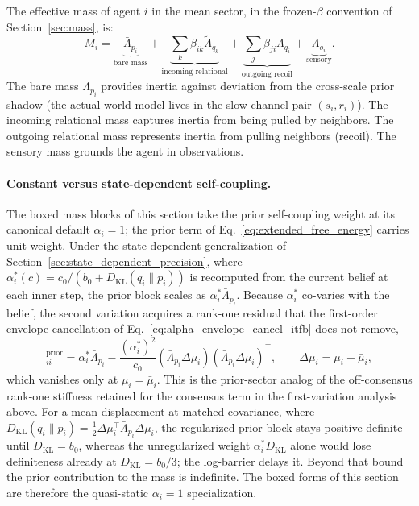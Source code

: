 \documentclass[11pt]{article}
\begin{document}
The effective mass of agent $i$ in the mean sector, in the frozen-$\beta$ convention of Section~\ref{sec:mass}, is:
\begin{equation}
M_i = \underbrace{\bar{\Lambda}_{p_i}}_{\text{bare mass}} + \underbrace{\sum_k \beta_{ik}\tilde{\Lambda}_{q_k}}_{\text{incoming relational}} + \underbrace{\sum_j \beta_{ji}\Lambda_{q_i}}_{\text{outgoing recoil}} + \underbrace{\Lambda_{o_i}}_{\text{sensory}}.
\label{eq:effective_mass}
\end{equation}
The bare mass $\bar{\Lambda}_{p_i}$ provides inertia against deviation from the cross-scale prior shadow (the actual world-model lives in the slow-channel pair $(s_i, r_i)$). The incoming relational mass captures inertia from being pulled by neighbors. The outgoing relational mass represents inertia from pulling neighbors (recoil). The sensory mass grounds the agent in observations.

\paragraph{Constant versus state-dependent self-coupling.} The boxed mass blocks of this section take the prior self-coupling weight at its canonical default $\alpha_i = 1$; the prior term of Eq.~\eqref{eq:extended_free_energy} carries unit weight. Under the state-dependent generalization of Section~\ref{sec:state_dependent_precision}, where $\alpha_i^*(c) = c_0/(b_0 + D_{\mathrm{KL}}(q_i \| p_i))$ is recomputed from the current belief at each inner step, the prior block scales as $\alpha_i^* \bar{\Lambda}_{p_i}$. Because $\alpha_i^*$ co-varies with the belief, the second variation acquires a rank-one residual that the first-order envelope cancellation of Eq.~\eqref{eq:alpha_envelope_cancel_itfb} does not remove,
\begin{equation}
[M_{\mu\mu}]_{ii}^{\text{prior}} = \alpha_i^* \bar{\Lambda}_{p_i} - \frac{(\alpha_i^*)^2}{c_0}\left(\bar{\Lambda}_{p_i}\Delta\mu_i\right)\left(\bar{\Lambda}_{p_i}\Delta\mu_i\right)^\top, \qquad \Delta\mu_i = \mu_i - \bar{\mu}_i,
\end{equation}
which vanishes only at $\mu_i = \bar{\mu}_i$. This is the prior-sector analog of the off-consensus rank-one stiffness retained for the consensus term in the first-variation analysis above. For a mean displacement at matched covariance, where $D_{\mathrm{KL}}(q_i \| p_i) = \tfrac{1}{2}\Delta\mu_i^\top \bar{\Lambda}_{p_i}\Delta\mu_i$, the regularized prior block stays positive-definite until $D_{\mathrm{KL}} = b_0$, whereas the unregularized weight $\alpha_i^* D_{\mathrm{KL}}$ alone would lose definiteness already at $D_{\mathrm{KL}} = b_0/3$; the log-barrier delays it. Beyond that bound the prior contribution to the mass is indefinite. The boxed forms of this section are therefore the quasi-static $\alpha_i = 1$ specialization.
\end{document}

